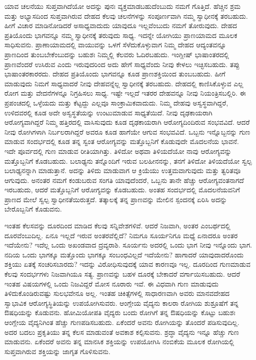 ಯಾವ ಚಲನೆಯು ಸುಪ್ತವಾಗಿದೆಯೋ ಅದನ್ನು ಪುನಃ ವ್ಯಕ್ತಮಾಡಬಹುದೆಂಬುದು ನಮಗೆ ಗೊತ್ತಿದೆ. ಹೆಚ್ಚಿನ ಶ್ರಮ ಮತ್ತು ಅಭ್ಯಾಸದಿಂದ ಸುಪ್ತವಾಗಿರುವ ದೇಹದ ಕೆಲವು ಚಲನೆಗಳನ್ನು ಸಂಪೂರ್ಣವಾಗಿ ನಮ್ಮ ಸ್ವಾಧೀನಕ್ಕೆ ತರಬಹುದು. ಹೀಗೆ ವಿಚಾರ ಮಾಡಿನೋಡಿದರೆ ಅಸಾಧ್ಯವಾದುದು ಯಾವುದೂ ಇಲ್ಲವೆಂಬುದು ನಮಗೆ ತೋರುವುದು. ದೇಹದ ಪ್ರತಿಯೊಂದು ಭಾಗವನ್ನೂ ನಮ್ಮ ಸ್ವಾಧೀನಕ್ಕೆ ತರುವುದು ಸಾಧ್ಯ. ಇದನ್ನೇ ಯೋಗಿಯು ಪ್ರಾಣಯಾಮದ ಮೂಲಕ ಸಾಧಿಸುವನು. ಪ್ರಾಣಾಯಾಮದಲ್ಲಿ ವಾಯುವನ್ನು ಒಳಗೆ ಸೆಳೆದುಕೊಳ್ಳುವಾಗ ನಿಮ್ಮ ದೇಹದ ಆದ್ಯಂತವನ್ನೂ ಪ್ರಾಣದಿಂದ ತುಂಬಬೇಕೆಂಬುದನ್ನು ಬಹುಶಃ ನಿಮ್ಮಲ್ಲಿ ಕೆಲವರು ಓದಿರಬಹುದು. ಇಂಗ್ಲೀಷ್​ ಭಾಷಾಂತರದಲ್ಲಿ ಪ್ರಾಣವೆಂದರೆ ಉಸಿರುವ ಎಂದು ಇರುವುದರಿಂದ ಅದು ಹೇಗೆ ಸಾಧ್ಯವೆಂದು ನೀವು ಕೇಳಲು ಇಚ್ಛಿಸಬಹುದು. ತಪ್ಪು ಭಾಷಾಂತರಕಾರರದು. ದೇಹದ ಪ್ರತಿಯೊಂದು ಭಾಗವನ್ನೂ ಕೂಡ ಪ್ರಾಣಶಕ್ತಿಯಿಂದ ತುಂಬಬಹುದು. ಹೀಗೆ ಮಾಡುವುದು ನಿಮಗೆ ಸಾಧ್ಯವಾದರೆ ನೀವು ದೇಹವನ್ನೆಲ್ಲ ಸ್ವಾಧೀನಕ್ಕೆ ತರಬಹುದು. ದೇಹದಲ್ಲಿ ಕಾಣಿಸಿಕೊಳ್ಳುವ ಎಲ್ಲ ರೋಗ ಮತ್ತು ವೇದನೆಗಳನ್ನೂ ನಿಗ್ರಹಿಸಲು ಸಾಧ್ಯ. ಇಷ್ಟೇ ಇಲ್ಲದೆ ಇತರರ ದೇಹವನ್ನೂ ನೀವು ನಿಯಂತ್ರಿಸಬಲ್ಲಿರಿ. ಈ ಪ್ರಪಂಚದಲ್ಲಿ ಒಳ್ಳೆಯದು ಮತ್ತು ಕೆಟ್ಟದ್ದು ಎಲ್ಲವೂ ಸಾಂಕ್ರಾಮಿಕವಾದುದು. ನಿಮ್ಮ ದೇಹವು ಅಸ್ವಸ್ಥವಾಗಿದ್ದರೆ, ಉಳಿದವರಲ್ಲಿ ಕೂಡ ಅದೇ ಅಸ್ವಸ್ಥತೆಯನ್ನು ಉಂಟುಮಾಡುವ ಸಾಧ್ಯತೆಯಿದೆ. ನೀವು ದೃಢಕಾಯರಾಗಿ ಆರೋಗ್ಯವಾಗಿದ್ದರೆ ನಿಮ್ಮ ಹತ್ತಿರದಲ್ಲಿ ವಾಸಿಸುವುದು ಕೂಡ ದೃಢಕಾಯರಾಗಿ ಆರೋಗ್ಯದಿಂದಿರುವ ಸಂಭವವಿದೆ. ಆದರೆ ನೀವು ರೋಗಿಗಳಾಗಿ ನಿರ್ಬಲರಾಗಿದ್ದರೆ ಅವರೂ ಕೂಡ ಹಾಗೆಯೇ ಆಗುವ ಸಂಭವವಿದೆ. ಒಬ್ಬನು ಇನ್ನೊಬ್ಬನನ್ನು ಗುಣ ಮಾಡುವ ಸಂದರ್ಭದಲ್ಲಿ ಕೂಡ ತನ್ನ ಸ್ವಂತ ಆರೋಗ್ಯವನ್ನು ಮತ್ತೊಬ್ಬನಿಗೆ ಕೊಡುವುದೇ ಮೊದಲನೆಯ ಭಾವನೆ. ಇದೇ ಪೂರ್ವದಲ್ಲಿ ಗುಣ ಮಾಡುವ ರೀತಿಯಾಗಿತ್ತು. ತಿಳಿದೋ ಅಥವಾ ತಿಳಿಯದೆಯೋ ನಾವು ಆರೋಗ್ಯವನ್ನು ಮತ್ತೊಬ್ಬನಿಗೆ ಕೊಡಬಹುದು. ಬಲಾಢ್ಯನು ತನ್ನೊಂದಿಗೆ ಇರುವ ಬಲಹೀನನನ್ನು, ತನಗೆ ತಿಳಿದೋ ತಿಳಿಯದೆಯೋ ಸ್ವಲ್ಪ ಬಲಾಢ್ಯನನ್ನಾಗಿ ಮಾಡುತ್ತಾನೆ. ಅದನ್ನು ತಿಳಿದು ಮಾಡುವಾಗ ಆ ಕ್ರಿಯೆಯು ಉತ್ತಮವಾಗುವುದು ಮತ್ತು ತ್ವರಿತವೂ ಆಗುವುದು. ಅನಂತರ ನಮಗೆ ಕಂಡುಬರುವ ಸಂಗತಿ ಯಾವುದೆಂದರೆ, ಒಬ್ಬನು ತಾನೇ ಹೆಚ್ಚು ಆರೋಗ್ಯವಂತನಾಗದೆ ಇರಬಹುದು, ಆದರೆ ಮತ್ತೊಬ್ಬನಿಗೆ ಆರೋಗ್ಯವನ್ನು ಕೊಡಬಹುದು. ಅಂತಹ ಸಂದರ್ಭದಲ್ಲಿ ಮೊದಲನೆಯವನಿಗೆ ಪ್ರಾಣದ ಮೇಲೆ ಸ್ವಲ್ಪ ಸ್ವಾಧೀನತೆಯಿರುತ್ತದೆ. ತತ್ಕಾಲಕ್ಕೆ ತನ್ನ ಪ್ರಾಣವನ್ನು ಮೇಲಿನ ಸ್ಪಂದನಕ್ಕೆ ಏರಿಸಿ ಅದನ್ನು ಬೇರೊಬ್ಬನಿಗೆ ಕೊಡುವನು. 

ಇಂತಹ ಕೆಲಸವನ್ನು ದೂರದಿಂದ ಮಾಡಿದ ಕೆಲವು ಸನ್ನಿವೇಶಗಳಿವೆ. ಆದರೆ ನಿಜವಾಗಿ, ಅಂತರ ಎಂಬರ್ಥದಲ್ಲಿ ದೂರವೆಂಬುದಿಲ್ಲ. ಏನೂ ಇಲ್ಲದೆ ಇರುವ ಅಂತರವೆಲ್ಲಿದೆ? ನಿಮಗೂ ಸೂರ್ಯನಿಗೂ ಮಧ್ಯೆ ಏನಾದರೂ ಅಂತರ ಇದೆಯೇನು? ಇದೆಲ್ಲ ಒಂದು ಅಖಂಡವಾದ ದ್ರವ್ಯರಾಶಿ. ಸೂರ್ಯನು ಅದರಲ್ಲಿ ಒಂದು ಭಾಗ ನೀವು ಇನ್ನೊಂದು ಭಾಗ. ನದಿಯ ಒಂದು ಭಾಗಕ್ಕೂ ಮತ್ತೊಂದು ಭಾಗಕ್ಕೂ ಸಂಬಂಧವಿಲ್ಲದೆ ಇದೆಯೇನು? ಹಾಗಾದರೆ ಯಾವುದಾದರೊಂದು ಶಕ್ತಿಯು ಏತಕ್ಕೆ ಸಂಚರಿಸಬಾರದು? ಇದನ್ನು ವಿರೋಧಿಸುವುದಕ್ಕೆ ಯಾವ ಕಾರಣವೂ ಇಲ್ಲ. ದೂರದಿಂದ ಗುಣಮಾಡುವ ಕೆಲವು ಸಂದರ್ಭಗಳು ನಿಜವಾಗಿಯೂ ಸತ್ಯ. ಪ್ರಾಣವನ್ನು ಬಹಳ ದೂರಕ್ಕೆ ಬೇಕಾದರೆ ವರ್ಗಾಯಿಸಬಹುದು. ಆದರೆ ಇಂತಹ ವಿಷಯಗಳಲ್ಲಿ ಒಂದು ನಿಜವಿದ್ದರೆ ಮೋಸ ನೂರಾರು ಇವೆ. ಈ ವಿಧವಾಗಿ ಗುಣ ಮಾಡುವುದು ತಿಳಿದುಕೊಂಡಿರುವಷ್ಟು ಸುಲಭವೇನೂ ಅಲ್ಲ. ಇಂತಹ ಚಿಕಿತ್ಸೆಗಳಲ್ಲಿ ಸಾಧಾರಣವಾಗಿ ಅವರು ಮಾನವದೇಹದ ಸ್ವಾಭಾವಿಕ ಆರೋಗ್ಯಸ್ಥಿತಿಯನ್ನು ಉಪಯೋಗಿಸುವರು. ಆಂಗ್ಲೇಯ ವೈದ್ಯನು ಕಾಲರಾ ರೋಗಿಯ ಶುಶ್ರೂಷೆಗೆ ತನ್ನ ಔಷಧಿಯನ್ನು ಕೊಡುವನು. ಹೋಮಿಯೋಪತಿ ವೈದ್ಯರು ಬಂದು ರೋಗಿಗೆ ತನ್ನ ಔಷಧಿಯನ್ನು ಕೊಟ್ಟು ಬಹುಶಃ ಆಂಗ್ಲೇಯ ವೈದ್ಯನಿಗಿಂತ ಹೆಚ್ಚು ಗುಣಪಡಿಸಬಹುದು. ಏಕೆಂದರೆ ಅವನು ರೋಗಿಯನ್ನು ತೊಂದರೆ ಪಡಿಸುವುದಿಲ್ಲ. ಅದರ ಬದಲು ಪ್ರಕೃತಿಯು ತನ್ನ ಕೆಲಸ ಮಾಡುವಂತೆ ಅವಕಾಶ ಕಲ್ಪಿಸುವನು. ಶ್ರದ್ಧಾ ವೈದ್ಯನು ಇನ್ನೂ ಹೆಚ್ಚು ಗುಣ ಮಾಡುವನು. ಏಕೆಂದರೆ ಅವನು ತನ್ನ ಮಾನಸಿಕ ಶಕ್ತಿಯನ್ನು ಉಪಯೋಗಿಸಿ ನಂಬಿಕೆಯ ಮೂಲಕ ರೋಗಿಯಲ್ಲಿ ಸುಪ್ತವಾಗಿರುವ ಶಕ್ತಿಯನ್ನು ಜಾಗೃತ ಗೊಳಿಸುವನು. 


